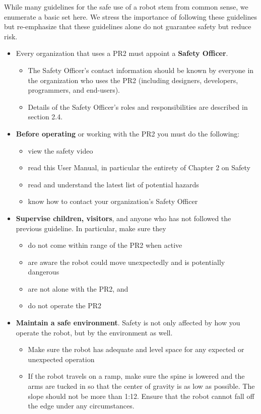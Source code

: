 While many guidelines for the safe use of a robot stem from common sense, we enumerate a basic set here.  We stress the importance of following these guidelines but re-emphasize that these guidelines alone do not guarantee safety but reduce risk.
\begin{itemize}
\item Every organization that uses a PR2 must appoint a {\bf Safety Officer}.
\begin{itemize}
\item The Safety Officer's contact information should be known by everyone in the organization who uses the PR2 (including designers, developers, programmers, and end-users).
\item Details of the Safety Officer's roles and responsibilities are described in section 2.4.
\end{itemize}
\item {\bf Before operating} or working with the PR2 you must do the following:
\begin{itemize}
\item view the safety video
\item read this User Manual, in particular the entirety of Chapter 2 on Safety
\item read and understand the latest list of potential hazards
\item know how to contact your organization's Safety Officer
\end{itemize}
\item {\bf Supervise children, visitors}, and anyone who has not followed the previous guideline.  In particular, make sure they
\begin{itemize}
\item do not come within range of the PR2 when active
\item are aware the robot could move unexpectedly and is potentially dangerous
\item are not alone with the PR2, and
\item do not operate the PR2
\end{itemize}
\item {\bf Maintain a safe environment}.  Safety is not only affected by how you operate the robot, but by the environment as well.
\begin{itemize}
\item Make sure the robot has adequate and level space for any expected or unexpected operation
\item If the robot travels on a ramp, make sure the spine is lowered and the arms are tucked in so that the center of gravity is as low as possible. The slope should not be more than 1:12. Ensure that the robot cannot fall off the edge under any circumstances.

\end{itemize}
\end{itemize}
